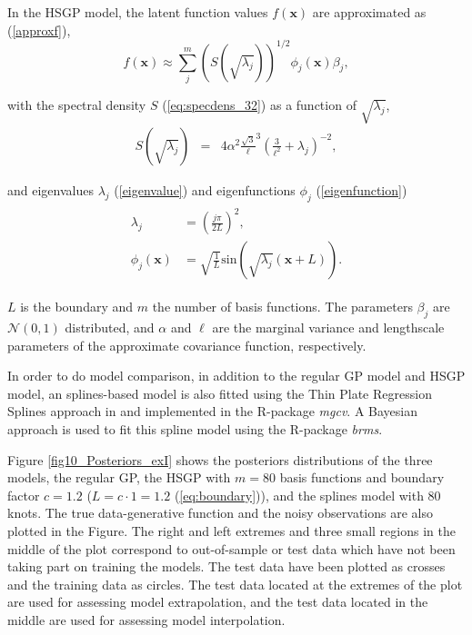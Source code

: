 \documentclass[]{interact}
\theoremstyle{plain}%
\theoremstyle{definition}
\theoremstyle{remark}
\begin{document}
In the HSGP model, the latent function values $f(\mathbf{x})$ are approximated as (\ref{approxf}),
%
\begin{equation*}
f(\mathbf{x}) \approx \sum_{j}^m \left( S(\sqrt{\lambda_j})\right)^{1/2} \phi_j(\mathbf{x}) \beta_j,
\end{equation*}

\noindent with the spectral density $S$ (\ref{eq:specdens_32}) as a function of $\sqrt{\lambda_j}$,
%
\begin{eqnarray*}
S(\sqrt{\lambda_j})&=& 4\alpha^2 \frac{\sqrt{3}}{\ell}^{3}(\frac{3}{\ell^2} + \lambda_j)^{-2}, 
\end{eqnarray*}

\noindent and eigenvalues $\lambda_j$ (\ref{eigenvalue}) and eigenfunctions $\phi_j$ (\ref{eigenfunction})
%
\begin{eqnarray*}
\begin{split}
\lambda_j&=\left(\frac{j\pi}{2L}\right)^2, \\
\phi_j(\mathbf{x})&=\sqrt{\frac{1}{L}} \text{sin}\left(\sqrt{\lambda_j}(\mathbf{x}+L)\right).
\end{split}
\end{eqnarray*} 

\noindent $L$ is the boundary and $m$ the number of basis functions. The parameters $\beta_j$ are $\mathcal{N}(0,1)$ distributed, and $\alpha$ and $\ell$ are the marginal variance and lengthscale parameters of the approximate covariance function, respectively.

In order to do model comparison, in addition to the regular GP model and HSGP model, an splines-based model is also fitted using the Thin Plate Regression Splines approach in \cite{wood2003thin} and implemented in the R-package \textit{mgcv}. A Bayesian approach is used to fit this spline model using the R-package \textit{brms}.

Figure \ref{fig10_Posteriors_exI} shows the posteriors distributions of the three models, the regular GP, the HSGP with $m=80$ basis functions and boundary factor $c=1.2$ ($L=c\cdot 1= 1.2$ (\ref{eq:boundary})), and the splines model with 80 knots. The true data-generative function and the noisy observations are also plotted in the Figure. The right and left extremes and three small regions in the middle of the plot correspond to out-of-sample or test data which have not been taking part on training the models. The test data have been plotted as crosses and the training data as circles. The test data located at the extremes of the plot are used for assessing model extrapolation, and the test data located in the middle are used for assessing model interpolation.
\end{document}
